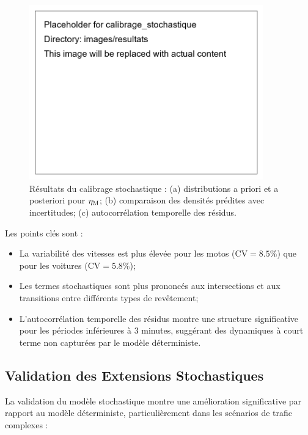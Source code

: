 \begin{figure}[htbp]
\centering
\includegraphics[width=0.9\textwidth]{images/resultats/calibrage_stochastique}
\caption{Résultats du calibrage stochastique : (a) distributions a priori et a posteriori pour $\eta_{\text{M}}$; (b) comparaison des densités prédites avec incertitudes; (c) autocorrélation temporelle des résidus.}
\label{fig:calibrage_stochastique}
\end{figure}

Les points clés sont :
\begin{itemize}
\item La variabilité des vitesses est plus élevée pour les motos ($\text{CV} = 8.5\%$) que pour les voitures ($\text{CV} = 5.8\%$);
\item Les termes stochastiques sont plus prononcés aux intersections et aux transitions entre différents types de revêtement;
\item L'autocorrélation temporelle des résidus montre une structure significative pour les périodes inférieures à 3 minutes, suggérant des dynamiques à court terme non capturées par le modèle déterministe.
\end{itemize}

\subsection{Validation des Extensions Stochastiques}
\label{subsec:validation_stochastique}

La validation du modèle stochastique montre une amélioration significative par rapport au modèle déterministe, particulièrement dans les scénarios de trafic complexes :

